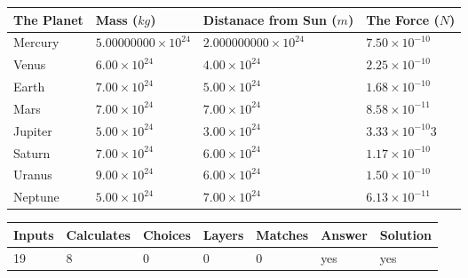 \documentclass[12pt]{article}
\begin{document}
\vspace{0.2in}
 
 
\begin{tabular}{|l|l|l|l|}
\hline
The Planet & Mass ($kg$) & Distanace from Sun ($m$) & The Force ($N$)\\
\hline
Mercury  &
           $ %
5.00000000 \times 10^{24}  $   &
             $ %
2.000000000 \times 10^{24}$    & $ %
7.50 \times 10^{-10} $
\\  \hline
Venus    &
           $  %
6.00 \times 10^{24}  $     &
             $ %
4.00 \times 10^{24} $    & $ %
2.25 \times 10^{-10} $
\\  \hline
Earth    &
           $  %
7.00 \times 10^{24}$     &
             $ %
5.00 \times 10^{24} $    & $ %
1.68 \times 10^{-10} $
\\   \hline
Mars     &
           $  %
7.00 \times 10^{24} $     &
             $ %
7.00 \times 10^{24}$    & $ %
8.58 \times 10^{-11} $
\\   \hline
Jupiter  &
           $  %
5.00 \times 10^{24}  $    &
             $ %
3.00 \times 10^{24} $    & $ %
3.33 \times 10^{-10}3 $
\\  \hline
Saturn   &
           $  %
7.00 \times 10^{24}   $    &
             $ %
6.00 \times 10^{24}  $    & $ %
1.17 \times 10^{-10} $
\\  \hline
Uranus   &
           $  %
9.00 \times 10^{24} $    &
             $ %
6.00 \times 10^{24}$    & $ %
1.50 \times 10^{-10} $
\\  \hline
Neptune  &
           $  %
5.00 \times 10^{24}  $    &
             $ %
7.00 \times 10^{24} $    & $ %
6.13 \times 10^{-11} $
\\  \hline
 
\end{tabular}
 
 
 
 
\noindent{}
 
 

 
\vspace{0.3in}
   
   
   
   
\noindent\begin{tabular}{|l|l|l|l|l|l|l|}
 \hline
Inputs & Calculates & Choices & Layers & Matches & Answer & Solution \\ \hline
          19 & 
           8 & 
           0
  & 
           0 & 
           0 & 
  yes & 
  yes 
  \\ \hline
 \end{tabular}
   
\end{document}

